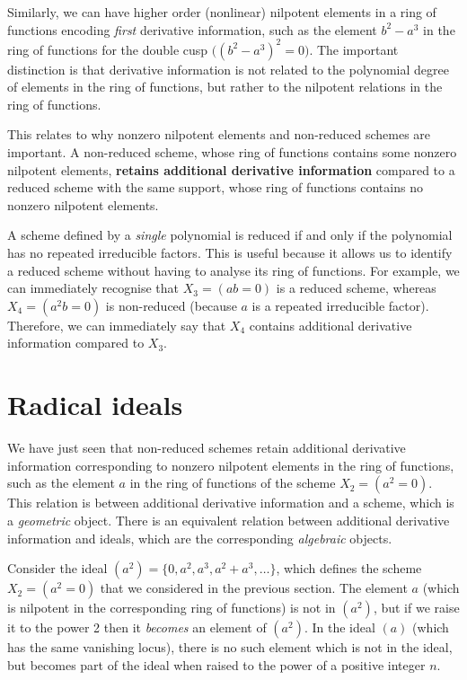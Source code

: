 \documentclass[12pt]{article}
\begin{document}
Similarly, we can have higher order (nonlinear) nilpotent elements in a ring of functions encoding \emph{first} derivative information, such as the element $b^2-a^3$ in the ring of functions for the double cusp $\bigl( \left(b^2-a^3\right)^2=0 \bigr)$. The important distinction is that derivative information is not related to the polynomial degree of elements in the ring of functions, but rather to the nilpotent relations in the ring of functions.

This relates to why nonzero nilpotent elements and non-reduced schemes are important. A non-reduced scheme, whose ring of functions contains some nonzero nilpotent elements, \textbf{retains additional derivative information} compared to a reduced scheme with the same support, whose ring of functions contains no nonzero nilpotent elements.

A scheme defined by a \emph{single} polynomial is reduced if and only if the polynomial has no repeated irreducible factors. This is useful because it allows us to identify a reduced scheme without having to analyse its ring of functions. For example, we can immediately recognise that $X_3=(ab=0)$ is a reduced scheme, whereas $X_4=(a^2b=0)$ is non-reduced (because $a$ is a repeated irreducible factor). Therefore, we can immediately say that $X_4$ contains additional derivative information compared to $X_3$.

\newpage
\section{Radical ideals}\label{Radical ideals}

We have just seen that non-reduced schemes retain additional derivative information corresponding to nonzero nilpotent elements in the ring of functions, such as the element $a$ in the ring of functions of the scheme $X_2=(a^2=0)$. This relation is between additional derivative information and a scheme, which is a \emph{geometric} object. There is an equivalent relation between additional derivative information and ideals, which are the corresponding \emph{algebraic} objects.

Consider the ideal $(a^2)=\{0, a^2, a^3, a^2+a^3, \dots\}$, which defines the scheme $X_2=(a^2=0)$ that we considered in the previous section. The element $a$ (which is nilpotent in the corresponding ring of functions) is not in $(a^2)$, but if we raise it to the power 2 then it \emph{becomes} an element of $(a^2)$. In the ideal $(a)$ (which has the same vanishing locus), there is no such element which is not in the ideal, but becomes part of the ideal when raised to the power of a positive integer $n$.
\end{document}
